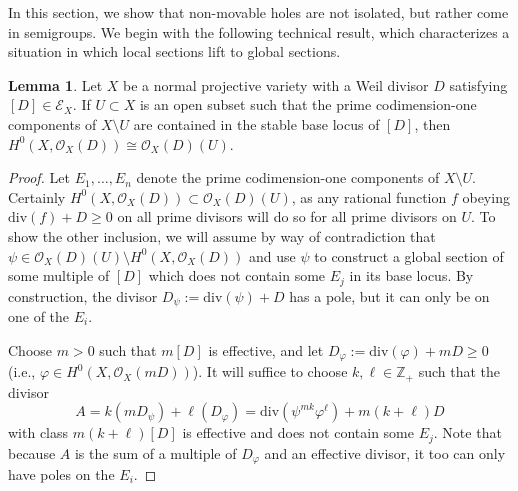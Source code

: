 \documentclass[11pt,dvipsnames]{article}
\theoremstyle{definition}
\newtheorem{lem}[theorem]{Lemma}
\begin{document}
In this section, we show that non-movable holes are not isolated, but rather come in semigroups. We begin with the following technical result, which characterizes a situation in which local sections lift to global sections.
\begin{lem}
    \label{lem:lift_to_global}
    Let $X$ be a normal projective variety with a Weil divisor $D$ satisfying $[D] \in \mathcal{E}_X$. If $U \subset X$ is an open subset such that the prime codimension-one components of $X \setminus U$ are contained in the stable base locus of $[D]$, then $H^0(X, \mathcal{O}_X(D)) \cong \mathcal{O}_X(D)(U)$.
\end{lem}
\begin{proof}
    Let $E_1, \dots, E_n$ denote the prime codimension-one components of $X \setminus U$. Certainly $H^0(X, \mathcal{O}_X(D)) \subset \mathcal{O}_X(D)(U)$, as any rational function $f$ obeying $\mathrm{div}(f) + D \geq 0$ on all prime divisors will do so for all prime divisors on $U$. To show the other inclusion, we will assume by way of contradiction that $\psi \in \mathcal{O}_X(D)(U) \setminus H^0(X, \mathcal{O}_X(D))$ and use $\psi$ to construct a global section of some multiple of $[D]$ which does not contain some $E_j$ in its base locus. By construction, the divisor $D_\psi := \mathrm{div}(\psi) + D$ has a pole, but it can only be on one of the $E_i$.

    Choose $m > 0$ such that $m[D]$ is effective, and let $D_\varphi := \mathrm{div}(\varphi) + mD \geq 0$ (i.e., $\varphi \in H^0(X, \mathcal{O}_X(mD))$). It will suffice to choose $k,\ell \in \mathbb{Z}_+$ such that the divisor 
    \begin{equation}
        A = k(mD_\psi) + \ell(D_\varphi) = \mathrm{div}(\psi^{mk}\varphi^{\ell}) + m(k+\ell)D
    \end{equation}
    with class $m(k+\ell)[D]$ is effective and does not contain some $E_j$. Note that because $A$ is the sum of a multiple of $D_\varphi$ and an effective divisor, it too can only have poles on the $E_i$. 
    

\end{proof}
\end{document}
